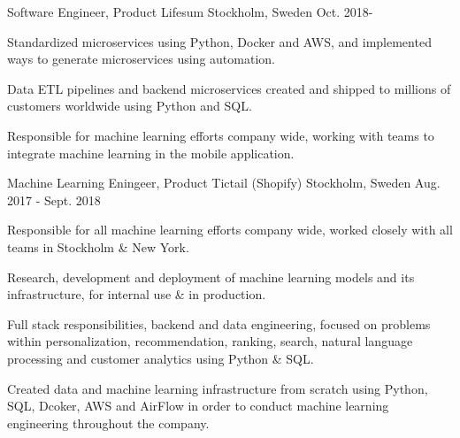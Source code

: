 

\begin{cventries}

  \cventry
    {Software Engineer, Product} %
    {Lifesum} %
    {Stockholm, Sweden} %
    {Oct. 2018-} %
    {
      \begin{cvitems} %
      \item {Standardized microservices using Python, Docker and AWS, and implemented ways to generate microservices using automation.}
      \item {Data ETL pipelines and backend microservices created and shipped to millions of customers worldwide using Python and SQL.}
      \item {Responsible for machine learning efforts company wide, working with teams to integrate machine learning in the mobile application.}
      \end{cvitems}
    }

  \cventry
    {Machine Learning Eningeer, Product} %
    {Tictail (Shopify)} %
    {Stockholm, Sweden} %
    {Aug. 2017 - Sept. 2018} %
    {
      \begin{cvitems} %
        \item {Responsible for all machine learning efforts company wide, worked closely with all teams in Stockholm \& New York.}
        \item {Research, development and deployment of machine learning models and its infrastructure, for internal use \& in production.}
        \item {Full stack responsibilities, backend and data engineering, focused on problems within personalization, recommendation, ranking, search, natural language processing and customer analytics using Python \& SQL.}
        \item {Created data and machine learning infrastructure from scratch using Python, SQL, Dcoker, AWS and AirFlow in order to conduct machine learning engineering throughout the company.}
      \end{cvitems}
    }


\end{cventries}
